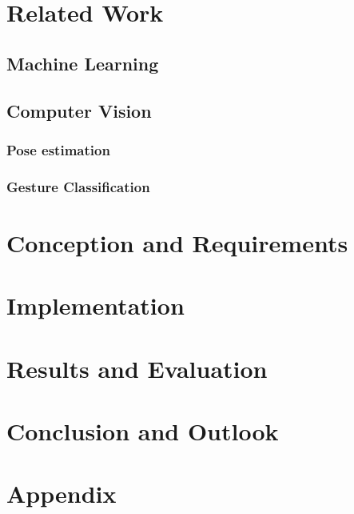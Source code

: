 \documentclass[12pt,a4paper,twoside]{report}
\theoremstyle{definition}
\begin{document}
    \chapter{Related Work}
			\section{Machine Learning}
			\section{Computer Vision}
				\subsection{Pose estimation}
				\subsection{Gesture Classification}
				
	

	\chapter{Conception and Requirements}
	\label{ch:Konzept}  	
		
    \cleardoublepage    
    
    \chapter{Implementation}
    \label{ch:implementierung}   
   		
   		
    \chapter{Results and Evaluation}
	\label{ch:Bewertung}  
		
    \cleardoublepage    

    \chapter{Conclusion and Outlook}

    \chapter{Appendix}
    \cleardoublepage
    
\end{document}
